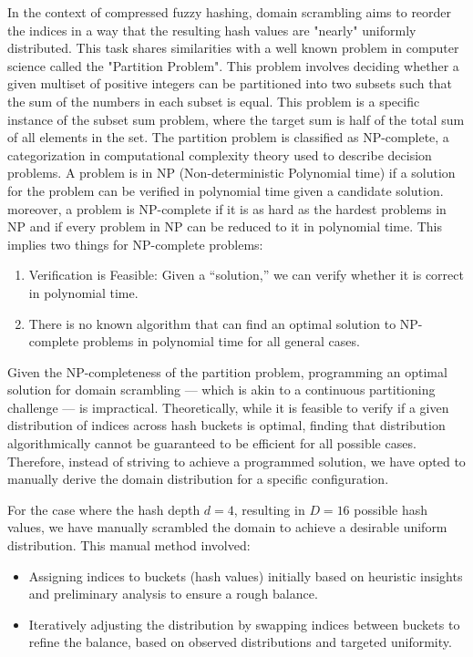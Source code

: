 In the context of compressed fuzzy hashing, domain scrambling aims to reorder the indices in a way that the resulting hash values are "nearly" uniformly distributed. This task shares similarities with a well known problem in computer science called the "Partition Problem". This problem involves deciding whether a given multiset of positive integers can be partitioned into two subsets such that the sum of the numbers in each subset is equal. This problem is a specific instance of the subset sum problem, where the target sum is half of the total sum of all elements in the set. The partition problem is classified as NP-complete, a categorization in computational complexity theory used to describe decision problems. A problem is in NP (Non-deterministic Polynomial time) if a solution for the problem can be verified in polynomial time given a candidate solution. moreover, a problem is NP-complete if it is as hard as the hardest problems in NP and if every problem in NP can be reduced to it in polynomial time. This implies two things for NP-complete problems:

\begin{enumerate}
    \item Verification is Feasible: Given a ``solution,'' we can verify whether it is correct in polynomial time.
    \item There is no known algorithm that can find an optimal solution to NP-complete problems in polynomial time for all general cases.
\end{enumerate}

Given the NP-completeness of the partition problem, programming an optimal solution for domain scrambling — which is akin to a continuous partitioning challenge — is impractical. Theoretically, while it is feasible to verify if a given distribution of indices across hash buckets is optimal, finding that distribution algorithmically cannot be guaranteed to be efficient for all possible cases. Therefore, instead of striving to achieve a programmed solution, we have opted to manually derive the domain distribution for a specific configuration.

For the case where the hash depth \(d=4\), resulting in \(D=16\) possible hash values, we have manually scrambled the domain to achieve a desirable uniform distribution. This manual method involved:
\begin{itemize}
    \item Assigning indices to buckets (hash values) initially based on heuristic insights and preliminary analysis to ensure a rough balance.
    \item Iteratively adjusting the distribution by swapping indices between buckets to refine the balance, based on observed distributions and targeted uniformity.
\end{itemize}

